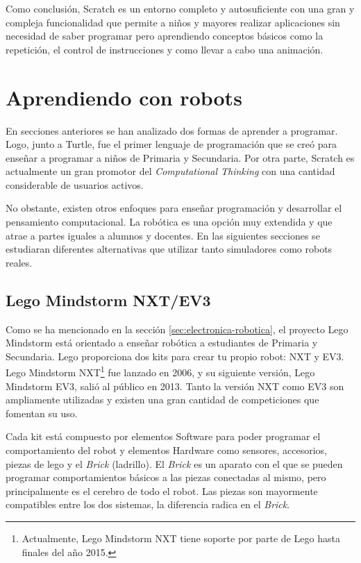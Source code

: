 {{Como conclusión, Scratch es un entorno completo y autosuficiente con una gran y compleja funcionalidad que permite a niños y mayores realizar aplicaciones sin necesidad de saber programar pero aprendiendo conceptos básicos como la repetición, el control de instrucciones y como llevar a cabo una animación. 



\section{Aprendiendo con robots}
\label{sec:aprendiendo-robots}


En secciones anteriores se han analizado dos formas de aprender a programar. Logo, junto a Turtle, fue el primer lenguaje de programación que se creó para enseñar a programar a niños de Primaria y Secundaria. Por otra parte, Scratch es actualmente un gran promotor del \emph{Computational Thinking} con una cantidad considerable de usuarios activos.

No obstante, existen otros enfoques para enseñar programación y desarrollar el pensamiento computacional. La robótica es una opción muy extendida y que atrae a partes iguales a alumnos y docentes. En las siguientes secciones se estudiaran diferentes alternativas que utilizar tanto simuladores como robots reales.


\subsection{Lego Mindstorm NXT/EV3}
\label{sec:lego-nxt-ec3}

Como se ha mencionado en la sección \ref{sec:electronica-robotica}, el proyecto Lego Mindstorm\cite{lego-mindstorm} está orientado a enseñar robótica a estudiantes de Primaria y Secundaria. Lego proporciona dos kits para crear tu propio robot: NXT y EV3. Lego Mindstorm NXT\footnote{Actualmente, Lego Mindstorm NXT tiene soporte por parte de Lego hasta finales del año 2015.} fue lanzado en 2006, y su siguiente versión, Lego Mindstorm EV3, salió al público en 2013. Tanto la versión NXT como EV3 son ampliamente utilizadas y existen una gran cantidad de competiciones que fomentan su uso.

Cada kit está compuesto por elementos Software para poder programar el comportamiento del robot y elementos Hardware como sensores, accesorios, piezas de lego y el \emph{Brick} (ladrillo). El \emph{Brick} es un aparato con el que se pueden programar comportamientos básicos a las piezas conectadas al mismo, pero principalmente es el cerebro de todo el robot. Las piezas son mayormente compatibles entre los dos sistemas, la diferencia radica en el \emph{Brick}. 

}}
